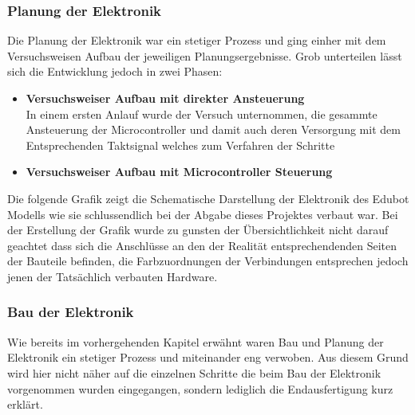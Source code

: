\subsubsection{Planung der Elektronik}
Die Planung der Elektronik war ein stetiger Prozess und ging einher mit dem Versuchsweisen Aufbau der jeweiligen Planungsergebnisse. Grob unterteilen lässt sich die Entwicklung jedoch in zwei Phasen:
\begin{itemize}
\item \textbf{Versuchsweiser Aufbau mit direkter Ansteuerung}\\
In einem ersten Anlauf wurde der Versuch unternommen, die gesammte Ansteuerung der Microcontroller und damit auch deren Versorgung mit dem Entsprechenden Taktsignal welches zum Verfahren der Schritte 
\item \textbf{Versuchsweiser Aufbau mit Microcontroller Steuerung}\\
\end{itemize}
Die folgende Grafik zeigt die Schematische Darstellung der Elektronik des Edubot Modells wie sie schlussendlich bei der Abgabe dieses Projektes verbaut war. Bei der Erstellung der Grafik wurde zu gunsten der Übersichtlichkeit nicht darauf geachtet dass sich die Anschlüsse an den der Realität entsprechendenden Seiten der Bauteile befinden, die Farbzuordnungen der Verbindungen entsprechen jedoch jenen der Tatsächlich verbauten Hardware.
\subsubsection{Bau der Elektronik}
Wie bereits im vorhergehenden Kapitel erwähnt waren Bau und Planung der Elektronik ein stetiger Prozess und miteinander eng verwoben. Aus diesem Grund wird hier nicht näher auf die einzelnen Schritte die beim Bau der Elektronik vorgenommen wurden eingegangen, sondern lediglich die Endausfertigung kurz erklärt.